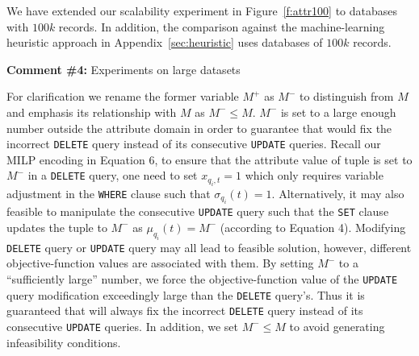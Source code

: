 We have extended our scalability experiment in Figure~\ref{f:attr100} to
databases with $100k$ records. In addition, the comparison against the
machine-learning heuristic approach in Appendix~\ref{sec:heuristic} uses
databases of $100k$ records.



\comskip

\noindent
\textbf{Comment \#4:} Experiments on large datasets
\begin{quote}
\end{quote}


For clarification we rename the former variable $M^+$ as $M^-$ to distinguish
from $M$ and emphasis its relationship with $M$ as $M^- \leq M$. $M^-$ is set
to a large enough number outside the attribute domain in order to guarantee
that \sys would fix the incorrect \texttt{DELETE} query instead of its
consecutive \texttt{UPDATE} queries. Recall our MILP encoding in Equation 6,
to ensure that the attribute value of tuple is set to $M^-$ in a
\texttt{DELETE} query, one need to set $x_{q_i,t} = 1$ which only requires
variable adjustment in the \texttt{WHERE} clause such that $\sigma_{q_i}(t) =
1$. Alternatively, it may also feasible to manipulate the consecutive
\texttt{UPDATE} query such that the \texttt{SET} clause updates the tuple to
$M^-$ as $\mu_{q_i}(t) = M^-$ (according to Equation 4). Modifying
\texttt{DELETE} query or \texttt{UPDATE} query may all lead to feasible
solution, however, different objective-function values are associated with
them. By setting $M^-$ to a ``sufficiently large'' number, we force the
objective-function value of the \texttt{UPDATE} query modification exceedingly
large than the \texttt{DELETE} query's. Thus it is guaranteed that \sys will
always fix the incorrect \texttt{DELETE} query instead of its consecutive
\texttt{UPDATE} queries. In addition, we set $M^- \leq M$ to avoid generating
infeasibility conditions.



